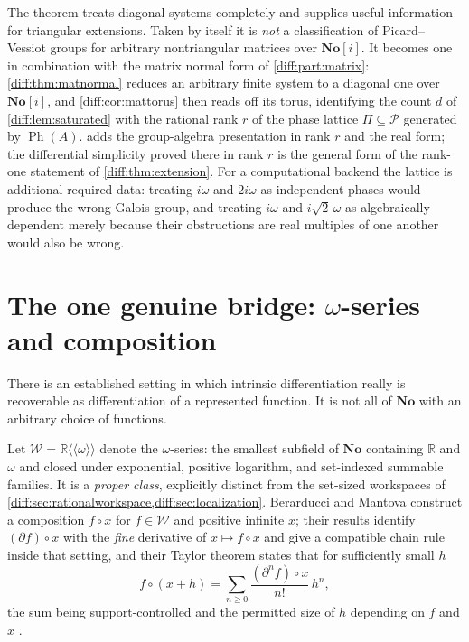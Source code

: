 \documentclass[11pt,letterpaper]{article}
\numberwithin{equation}{section}
\theoremstyle{definition}
\theoremstyle{remark}
\newcommand{\No}{\mathbf{No}}
\newcommand{\SC}{\mathbf{No}[i]}
\newcommand{\R}{\mathbb R}
\newcommand{\der}{\partial}
\newcommand{\Pcl}{\mathcal P}
\newcommand{\Ph}{\operatorname{Ph}}
\begin{document}
The theorem treats diagonal systems completely and supplies useful information
for triangular extensions. Taken by itself it is \emph{not} a classification of
Picard--Vessiot groups for arbitrary nontriangular matrices over $\SC$. It
becomes one in combination with the matrix normal form of \cref{diff:part:matrix}:
\cref{diff:thm:matnormal} reduces an arbitrary finite system to a diagonal one
over $\SC$, and \cref{diff:cor:mattorus} then reads off its torus, identifying
the count $d$ of \cref{diff:lem:saturated} with the rational rank $r$ of the
phase lattice $\Pi\subseteq\Pcl$ generated by $\Ph(A)$.
 adds the group-algebra presentation in rank $r$
and the real form; the differential simplicity proved there in rank $r$ is the
general form of the rank-one statement of \cref{diff:thm:extension}. For a
computational backend the lattice is additional required data: treating
$i\omega$ and $2i\omega$ as independent phases would produce the wrong Galois
group, and treating $i\omega$ and $i\sqrt2\,\omega$ as algebraically dependent
merely because their obstructions are real multiples of one another would also
be wrong.

\section{The one genuine bridge: \texorpdfstring{$\omega$}{omega}-series and composition}
\label{diff:sec:composition}

There is an established setting in which intrinsic differentiation really is
recoverable as differentiation of a represented function. It is not all of
$\No$ with an arbitrary choice of functions.

Let $\mathscr W=\R\langle\!\langle\omega\rangle\!\rangle$ denote the
$\omega$-series: the smallest subfield of $\No$ containing $\R$ and $\omega$
and closed under exponential, positive logarithm, and set-indexed summable
families. It is a \emph{proper class}, explicitly distinct from the set-sized
workspaces of \cref{diff:sec:rationalworkspace,diff:sec:localization}.
Berarducci and Mantova construct a composition $f\circ x$ for
$f\in\mathscr W$ and positive infinite $x$; their results identify
$(\der f)\circ x$ with the \emph{fine} derivative of $x\mapsto f\circ x$ and
give a compatible chain rule inside that setting, and their Taylor theorem
states that for sufficiently small $h$
\begin{equation}\label{diff:eq:omegaTaylor}
 f\circ(x+h)=\sum_{n\geq0}\frac{(\der^{n}f)\circ x}{n!}\,h^{n},
\end{equation}
the sum being support-controlled and the permitted size of $h$ depending on
$f$ and $x$ \cite[Cor.\ 7.6--7.7, Thms 7.14, 8.2]{BMGerms}.
\end{document}

